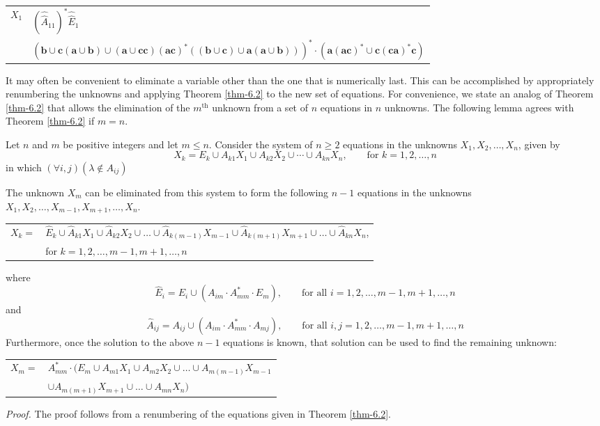 \begin{center}\begin{tabular}{r@{ = }l}
$X_1$ & $(\hat{\hat{A}}_{11})^*\hat{\hat{E}}_1$ \\
& $(\pmb{b}\cup\pmb{c}(\pmb{a}\cup\pmb{b})\cup(\pmb{a}\cup\pmb{cc})(\pmb{ac})^*
	((\pmb{b}\cup\pmb{c})\cup\pmb{a}(\pmb{a}\cup\pmb{b})))^*\cdot(\pmb{a}
	(\pmb{ac})^*\cup\pmb{c}(\pmb{ca})^*\pmb{c})$
\end{tabular}\end{center}

It may often be convenient to eliminate a variable other than the one that is
numerically last. This can be accomplished by appropriately renumbering the
unknowns and applying Theorem \ref{thm-6.2} to the new set of equations. For convenience,
we state an analog of Theorem \ref{thm-6.2} that allows the elimination of the $m^\text{th}$
unknown from a set of $n$ equations in $n$ unknowns. The following lemma agrees
with Theorem \ref{thm-6.2} if $m = n$.

\begin{lmm}\label{lmm-6.3}
Let $n$ and $m$ be positive integers and let $m \leq n$. Consider the system of
$n \geq 2$ equations in the unknowns $X_1,X_2,\ldots,X_n$, given by
\[ X_k = E_k \cup A_{k1}X_1 \cup A_{k2}X_2 \cup\cdots\cup A_{kn}X_n,\qquad
	\text{for }k = 1,2, \ldots , n \]
in which $(\forall i,j)(\lambda \not \in A_{ij})$

The unknown $X_m$ can be eliminated from this system to form the following $n-1$
equations in the unknowns $X_1,X_2,\ldots,X_{m-1},X_{m+1},\ldots,X_n$.
\begin{center}\begin{tabular}{r@{ }l}
$X_k =$ & $\hat{E}_k \cup \hat{A}_{k1}X_1 \cup \hat{A}_{k2}X_2 \cup\ldots\cup
	\hat{A}_{k(m-1)}X_{m-1}\cup\hat{A}_{k(m+1)}X_{m+1}\cup\ldots\cup
	\hat{A}_{kn}X_n$, \\
& for $k = 1, 2,\ldots,m-1,m+1, \ldots ,n$
\end{tabular}\end{center}
where
\[ \hat{E}_i = E_i \cup (A_{im}\cdot A^*_{mm}\cdot E_m),\qquad\text{for all }
	i = 1,2, \ldots ,m-1,m+1, \ldots ,n \]
and
\[ \hat{A}_{ij} = A_{ij} \cup (A_{im}\cdot A^*_{mm}\cdot A_{mj}),\qquad
	\text{for all }i,j = 1,2, \ldots ,m-1,m+1, \ldots ,n \]
Furthermore, once the solution to the above $n-1$ equations is known, that
solution can be used to find the remaining unknown:
\begin{center}\begin{tabular}{r@{ }l}
$X_m =$ & $A^*_{mm} \cdot (E_m \cup A_{m1}X_1 \cup A_{m2}X_2 \cup\ldots\cup
	A_{m(m-1)}X_{m-1}$ \\
& $\cup  A_{m(m+1)}X_{m+1}\cup\ldots\cup A_{mn}X_n)$
\end{tabular}\end{center}

\emph{Proof.} The proof follows from a renumbering of the equations given in
Theorem \ref{thm-6.2}.
\end{lmm}

